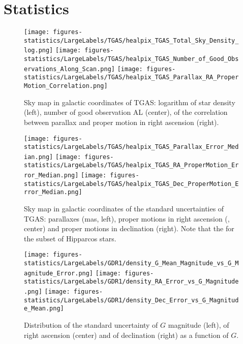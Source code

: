 \section{Statistics}\label{sec:statistics}
	  \begin{figure*}[!t]
	  \centering
	    \texttt{[image: figures-statistics/LargeLabels/TGAS/healpix\_TGAS\_Total\_Sky\_Density\_log.png]}
        \texttt{[image: figures-statistics/LargeLabels/TGAS/healpix\_TGAS\_Number\_of\_Good\_Observations\_Along\_Scan.png]}
        \texttt{[image: figures-statistics/LargeLabels/TGAS/healpix\_TGAS\_Parallax\_RA\_ProperMotion\_Correlation.png]}
    	      \caption{Sky map in galactic coordinates of TGAS: logarithm of star density (left),
	      number of good observation AL (center),
	       of the correlation between parallax and proper motion in right ascension (right).}
            \label{fig:TGAShealpix_stat_TotalSkyDensityLogCount-GAL_HealpixMapSAM}
    \end{figure*}
    
     \begin{figure*}[!h]
	  \centering
	    \texttt{[image: figures-statistics/LargeLabels/TGAS/healpix\_TGAS\_Parallax\_Error\_Median.png]}
	    \texttt{[image: figures-statistics/LargeLabels/TGAS/healpix\_TGAS\_RA\_ProperMotion\_Error\_Median.png]}
        \texttt{[image: figures-statistics/LargeLabels/TGAS/healpix\_TGAS\_Dec\_ProperMotion\_Error\_Median.png]}
  	      \caption{Sky map in galactic coordinates of the standard uncertainties of TGAS: parallaxes (mas, left),
	      proper motions in right ascension (\masyr, center) and
	      proper motions in declination (right). 
	      Note that the  for the subset of Hipparcos stars.} 
              \label{fig:Stats_HealpixMedianError-GAL_HealpixMapMedianSAM}
     \end{figure*}

    \begin{figure*}[!h]
	  \centering
	    \texttt{[image: figures-statistics/LargeLabels/GDR1/density\_G\_Mean\_Magnitude\_vs\_G\_Magnitude\_Error.png]}
      \texttt{[image: figures-statistics/LargeLabels/GDR1/density\_RA\_Error\_vs\_G\_Magnitude.png]}
	  \texttt{[image: figures-statistics/LargeLabels/GDR1/density\_Dec\_Error\_vs\_G\_Magnitude\_Mean.png]}
      \caption{Distribution of the standard uncertainty of $G$ magnitude (left),
      of right ascension (center) and 
      of declination (right) as a function of $G$.}\label{fig:Histogram2DDecErrorAgainstMagG_Histogram2DSAM}
    \end{figure*}

